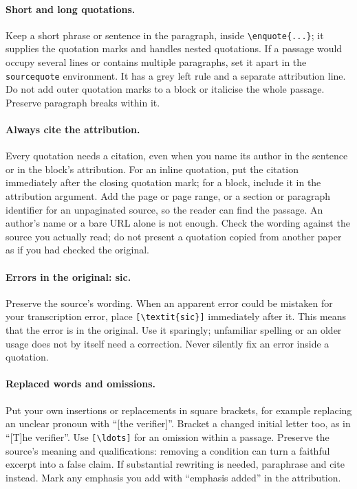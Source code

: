 \paragraph{Short and long quotations.} Keep a short phrase or sentence in the paragraph, inside \texttt{\textbackslash enquote\{...\}}; it supplies the quotation marks and handles nested quotations. If a passage would occupy several lines or contains multiple paragraphs, set it apart in the \texttt{sourcequote} environment. It has a grey left rule and a separate attribution line. Do not add outer quotation marks to a block or italicise the whole passage. Preserve paragraph breaks within it.

\paragraph{Always cite the attribution.} Every quotation needs a citation, even when you name its author in the sentence or in the block's attribution. For an inline quotation, put the citation immediately after the closing quotation mark; for a block, include it in the attribution argument. Add the page or page range, or a section or paragraph identifier for an unpaginated source, so the reader can find the passage. An author's name or a bare URL alone is not enough. Check the wording against the source you actually read; do not present a quotation copied from another paper as if you had checked the original.

\paragraph{Errors in the original: sic.} Preserve the source's wording. When an apparent error could be mistaken for your transcription error, place \texttt{[\textbackslash textit\{sic\}]} immediately after it. This means that the error is in the original. Use it sparingly; unfamiliar spelling or an older usage does not by itself need a correction. Never silently fix an error inside a quotation.

\paragraph{Replaced words and omissions.} Put your own insertions or replacements in square brackets, for example replacing an unclear pronoun with \enquote{[the verifier]}. Bracket a changed initial letter too, as in \enquote{[T]he verifier}. Use \texttt{[\textbackslash ldots]} for an omission within a passage. Preserve the source's meaning and qualifications: removing a condition can turn a faithful excerpt into a false claim. If substantial rewriting is needed, paraphrase and cite instead. Mark any emphasis you add with \enquote{emphasis added} in the attribution.

